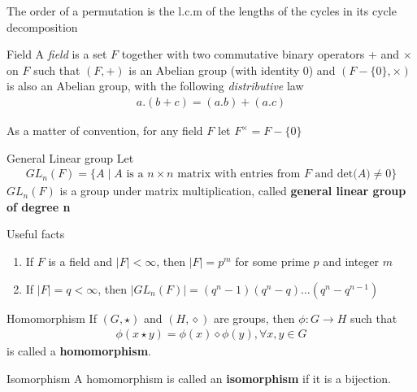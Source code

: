 \documentclass[titlepage, 12pt]{book}
\begin{document}
\begin{proposition}{}{}
The order of a permutation is the l.c.m of the lengths of the cycles in
its cycle decomposition
\end{proposition}


\begin{definition}{Field}{}
    A \textit{field} is a set $F$ together with two commutative binary
    operators + and $\times$ on $F$ such that $(F, +)$ is an Abelian group (with
    identity 0) and $(F-\{0\}, \times)$ is also an Abelian group, with the following
    \textit{distributive} law
    \begin{gather*}
        a.(b+c) = (a.b)+(a.c)
    \end{gather*}
\end{definition}
As a matter of convention, for any field $F$ let $F^\times = F-\{0\}$

\begin{definition}{General Linear group}{}
    Let
\begin{gather*}
GL_n(F) = \{A\mid A \textrm{ is a } n\times n\textrm{ matrix with entries from }
F\textrm{ and det(}A)\neq 0\}
\end{gather*}
$GL_n(F)$ is a group under matrix multiplication, called \textbf{general linear
group of degree n}
\end{definition}

Useful facts
\begin{enumerate}

    \item If $F$ is a field and $|F| < \infty$, then $|F| = p^m$ for some prime
        $p$ and integer $m$

    \item If $|F| = q < \infty$, then $|GL_n(F)| = (q^n - 1)(q^n -
        q)\dots(q^n-q^{n - 1})$

\end{enumerate}


\begin{definition}{Homomorphism}{}
If $(G, \star)$ and $(H, \diamond)$ are groups, then $\phi:G\rightarrow H$ such
that
\begin{gather*}
    \phi(x\star y) = \phi(x)\diamond\phi(y), \forall x, y\in G
\end{gather*}
is called a \textbf{homomorphism}.
\end{definition}

\begin{definition}{Isomorphism}{}
A homomorphism is called an \textbf{isomorphism} if it is a bijection.
\end{definition}
\end{document}
